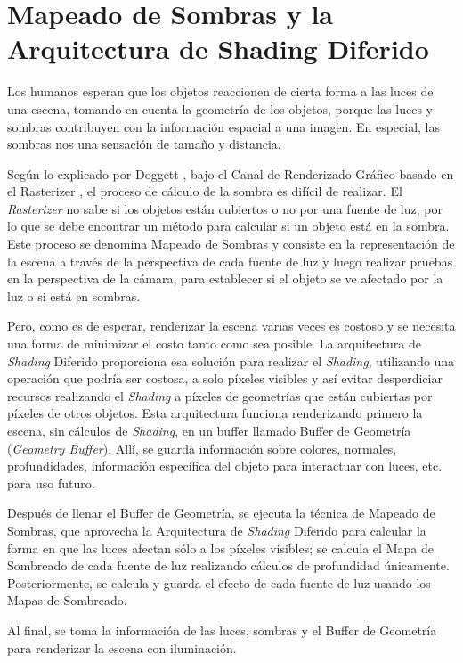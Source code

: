 \documentclass[pregrado]{tesis-usb} %
\begin{document}
\section[Mapeado de Sombras y la Arquitectura de Shading Diferido]{Mapeado de Sombras y la Arquitectura de Shading Diferido}

Los humanos esperan que los objetos reaccionen de cierta forma a las luces de una escena, tomando en cuenta la geometría de los objetos, porque las luces y sombras contribuyen con la información espacial a una imagen. En especial, las sombras nos una sensación de tamaño y distancia.

Según lo explicado por Doggett \cite{Doggett2017EDAN35}, bajo el Canal de Renderizado Gráfico basado en el Rasterizer , el proceso de cálculo de la sombra es difícil de realizar. El \textit{Rasterizer} no sabe si los objetos están cubiertos o no por una fuente de luz, por lo que se debe encontrar un método para calcular si un objeto está en la sombra. Este proceso se denomina Mapeado de Sombras y consiste en la representación de la escena a través de la perspectiva de cada fuente de luz y luego realizar pruebas en la perspectiva de la cámara, para establecer si el objeto se ve afectado por la luz o si está en sombras.

Pero, como es de esperar, renderizar la escena varias veces es costoso y se necesita una forma de minimizar el costo tanto como sea posible. La arquitectura de \textit{Shading} Diferido proporciona esa solución para realizar el \textit{Shading}, utilizando una operación que podría ser costosa, a solo píxeles visibles y así evitar desperdiciar recursos realizando el \textit{Shading} a píxeles de geometrías que están cubiertas por píxeles de otros objetos. Esta arquitectura funciona renderizando primero la escena, sin cálculos de \textit{Shading}, en un buffer llamado Buffer de Geometría (\textit{Geometry Buffer}). Allí, se guarda información sobre colores, normales, profundidades, información específica del objeto para interactuar con luces, etc. para uso futuro. 

Después de llenar el Buffer de Geometría, se ejecuta la técnica de Mapeado de Sombras, que aprovecha la Arquitectura de \textit{Shading} Diferido para calcular la forma en que las luces afectan sólo a los píxeles visibles; se calcula el Mapa de Sombreado de cada fuente de luz realizando cálculos de profundidad únicamente. Posteriormente, se calcula y guarda el efecto de cada fuente de luz usando los Mapas de Sombreado.

Al final, se toma la información de las luces, sombras y el Buffer de Geometría para renderizar la escena con iluminación.
\end{document}
